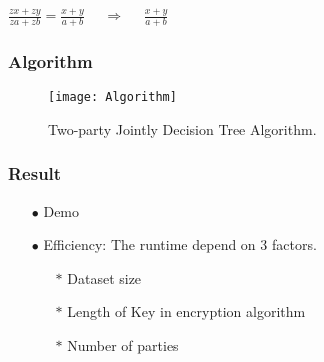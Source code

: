 \documentclass[xcolor=table]{beamer}
\begin{document}
\begin{frame}
\centerline{$\frac{zx+zy}{za+zb} = \frac{x+y}{a+b}$ $\quad \Rightarrow \quad$ $\frac{x+y}{a+b}$}
\vspace{4 mm}
\end{frame}

\begin{frame}
\frametitle{Algorithm}

\begin{figure}[H]
  \centering
  \texttt{[image: Algorithm]}
  \caption{Two-party Jointly Decision Tree Algorithm.}
\end{figure}



\end{frame}
\begin{frame}
\frametitle{Result}

\begin{itemize} \itemsep10pt \parskip0pt 
  \item[$\bullet$] Demo
  \item[$\bullet$] Efficiency: The runtime depend on 3 factors.
  \begin{itemize} \itemsep2pt \parskip0pt 
  \item[$\ast$] Dataset size
  \item[$\ast$] Length of Key in encryption algorithm
  \item[$\ast$] Number of parties
\end{itemize}
\end{itemize}
\end{frame}
\end{document}
